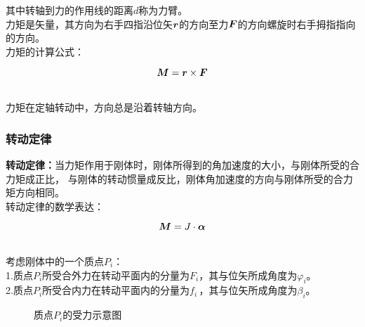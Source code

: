 \documentclass[UTF8]{ctexart}
\newcommand*{\veb}[1]{\vb*{#1}}
\begin{document}
    其中转轴到力的作用线的距离$d$称为力臂。\\[3mm]
    力矩是矢量，其方向为右手四指沿位矢$\veb{r}$的方向至力$\veb{F}$的方向螺旋时右手拇指指向的方向。\\[6mm]
    力矩的计算公式：
    \begin{large}
        \begin{equation*}
            \veb{M}=\veb{r}\times\veb{F}
        \end{equation*}
    \end{large}\\
    力矩在定轴转动中，方向总是沿着转轴方向。

\subsubsection{转动定律}
    \setcounter{equation}{0}
    \textbf{转动定律：}当力矩作用于刚体时，刚体所得到的角加速度的大小，与刚体所受的合力矩成正比，
    与刚体的转动惯量成反比，刚体角加速度的方向与刚体所受的合力矩方向相同。\\[3mm]
    转动定律的数学表达：
    \begin{large}
        \begin{equation*}
            \veb{M}=J\cdot\veb{\alpha}
        \end{equation*}
    \end{large}\\
    考虑刚体中的一个质点$P_i$：\\[3mm]
    1.质点$P_i$所受合外力在转动平面内的分量为$F_i$，其与位矢所成角度为$\varphi_i$。\\[3mm]
    2.质点$P_i$所受合内力在转动平面内的分量为$f_i\,$，其与位矢所成角度为$\beta_i$。\\[3mm]
    \begin{figure}[h]
        \begin{center}
            \caption{质点$P_i$的受力示意图}
        \end{center}
    \end{figure}\\
\end{document}
